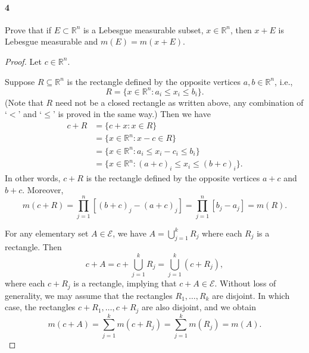 \documentclass[12pt]{article}
\newenvironment{fullbox}{\begin{lrbox}{\savefullbox}\begin{minipage}{\dimexpr\textwidth-2\fboxsep\relax}}{\end{minipage}\end{lrbox}\begin{center}\framebox[\textwidth]{\usebox{\savefullbox}}\end{center}}
\newenvironment{pbox}[1][]{\begin{fullbox}\ifx#1\empty\else\paragraph{#1}\fi}{\end{fullbox}}
\newcommand{\R}{\mathbb{R}}
\newcommand{\<}{\langle}
\renewcommand{\>}{\rangle}
\newcommand{\EE}{\mathcal{E}}
\begin{document}
\newpage
\begin{pbox}[4]
    Prove that if $E \subset \R^n$ is a Lebesgue measurable subset, $x \in \R^n$, then $x + E$ is Lebesgue measurable and $m(E) = m(x + E)$.
\end{pbox}

\begin{proof}
    Let $c \in \R^n$.

    Suppose $R \subseteq \R^n$ is the rectangle defined by the opposite vertices $a, b \in \R^n$, i.e.,
    \[
        R = \{x \in \R^n : a_i \leq x_i \leq b_i\}.
    \]
    (Note that $R$ need not be a closed rectangle as written above, any combination of `$<$' and `$\leq$' is proved in the same way.) Then we have
    \begin{align*}
        c + R
            &= \{c + x : x \in R\} \\
            &= \{x \in \R^n : x - c \in R\} \\
            &= \{x \in \R^n : a_i \leq x_i - c_i \leq b_i\} \\
            &= \{x \in \R^n : (a+c)_i \leq x_i \leq (b+c)_i\}.
    \end{align*}
    In other words, $c + R$ is the rectangle defined by the opposite vertices $a+c$ and $b+c$. Moreover,
    \[
        m(c + R)
            = \prod_{j=1}^{n} [(b+c)_j - (a+c)_j]
            = \prod_{j=1}^{n} [b_j - a_j]
            = m(R).
    \]

    For any elementary set $A \in \EE$, we have $A = \bigcup_{j=1}^{k} R_j$ where each $R_j$ is a rectangle. Then
    \[
        c + A = c + \bigcup_{j=1}^{k}R_j = \bigcup_{j=1}^{k}(c + R_j),
    \]
    where each $c + R_j$ is a rectangle, implying that $c + A \in \EE$. Without loss of generality, we may assume that the rectangles $R_1, \dots, R_k$ are disjoint. In which case, the rectangles $c + R_1, \dots, c + R_j$ are also disjoint, and we obtain
    \[
        m(c + A) = \sum_{j=1}^{k} m(c + R_j) = \sum_{j=1}^{k} m(R_j) = m(A).
    \]


\end{proof}
\end{document}
